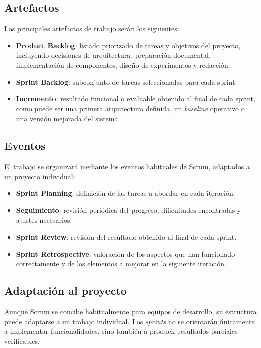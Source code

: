 \subsection{Artefactos}

Los principales artefactos de trabajo serán los siguientes:

\begin{itemize}
    \item \textbf{Product Backlog}: listado priorizado de tareas y objetivos del proyecto, incluyendo decisiones de arquitectura, preparación documental, implementación de componentes, diseño de experimentos y redacción.
    \item \textbf{Sprint Backlog}: subconjunto de tareas seleccionadas para cada sprint.
    \item \textbf{Incremento}: resultado funcional o evaluable obtenido al final de cada sprint, como puede ser una primera arquitectura definida, un \textit{baseline} operativo o una versión mejorada del sistema.
\end{itemize}

\subsection{Eventos}

El trabajo se organizará mediante los eventos habituales de Scrum, adaptados a un proyecto individual:

\begin{itemize}
    \item \textbf{Sprint Planning}: definición de las tareas a abordar en cada iteración.
    \item \textbf{Seguimiento}: revisión periódica del progreso, dificultades encontradas y ajustes necesarios.
    \item \textbf{Sprint Review}: revisión del resultado obtenido al final de cada sprint.
    \item \textbf{Sprint Retrospective}: valoración de los aspectos que han funcionado correctamente y de los elementos a mejorar en la siguiente iteración.
\end{itemize}

\subsection{Adaptación al proyecto}

Aunque Scrum se concibe habitualmente para equipos de desarrollo, su estructura puede adaptarse a un trabajo individual. 
Los \textit{sprints} no se orientarán únicamente a implementar funcionalidades, sino también a producir resultados parciales verificables.

